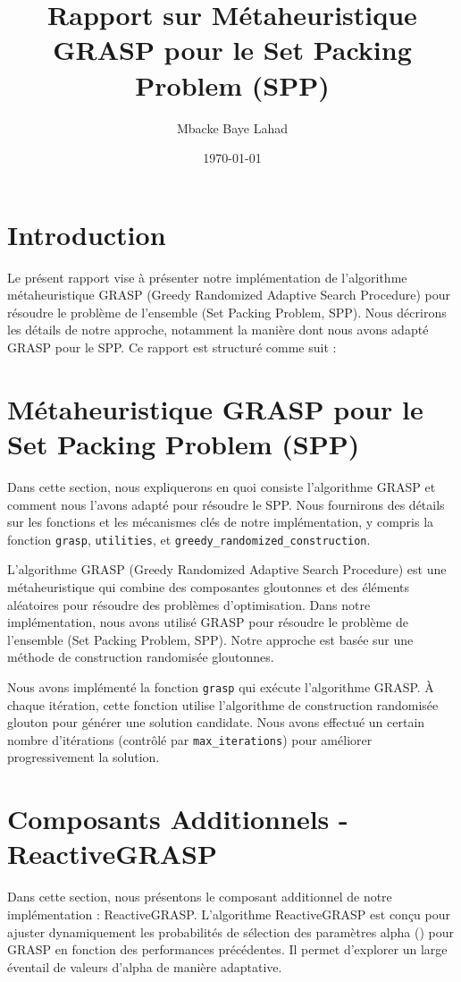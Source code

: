 \documentclass[12pt]{article}
\title{Rapport sur Métaheuristique GRASP pour le Set Packing Problem (SPP)}
\author{Mbacke Baye Lahad}
\date{\today}
\begin{document}
\maketitle

\section{Introduction}
Le présent rapport vise à présenter notre implémentation de l'algorithme métaheuristique GRASP (Greedy Randomized Adaptive Search Procedure) pour résoudre le problème de l'ensemble (Set Packing Problem, SPP). Nous décrirons les détails de notre approche, notamment la manière dont nous avons adapté GRASP pour le SPP. Ce rapport est structuré comme suit :

\section{Métaheuristique GRASP pour le Set Packing Problem (SPP)}
Dans cette section, nous expliquerons en quoi consiste l'algorithme GRASP et comment nous l'avons adapté pour résoudre le SPP. Nous fournirons des détails sur les fonctions et les mécanismes clés de notre implémentation, y compris la fonction \texttt{grasp}, \texttt{utilities}, et \texttt{greedy\_randomized\_construction}.

L'algorithme GRASP (Greedy Randomized Adaptive Search Procedure) est une métaheuristique qui combine des composantes gloutonnes et des éléments aléatoires pour résoudre des problèmes d'optimisation. Dans notre implémentation, nous avons utilisé GRASP pour résoudre le problème de l'ensemble (Set Packing Problem, SPP). Notre approche est basée sur une méthode de construction randomisée gloutonnes.

Nous avons implémenté la fonction \texttt{grasp} qui exécute l'algorithme GRASP. À chaque itération, cette fonction utilise l'algorithme de construction randomisée glouton  pour générer une solution candidate. Nous avons effectué un certain nombre d'itérations (contrôlé par \texttt{max\_iterations}) pour améliorer progressivement la solution.

\section{Composants Additionnels - ReactiveGRASP}
Dans cette section, nous présentons le composant additionnel de notre implémentation : ReactiveGRASP. L'algorithme ReactiveGRASP est conçu pour ajuster dynamiquement les probabilités de sélection des paramètres alpha (\textalpha) pour GRASP en fonction des performances précédentes. Il permet d'explorer un large éventail de valeurs d'alpha de manière adaptative.
\end{document}
